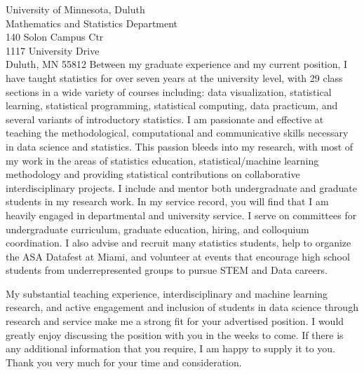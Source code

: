 \documentclass[11pt]{letter}\usepackage[]{graphicx}\usepackage[]{color}
\begin{document}
\begin{letter}{University of Minnesota, Duluth\\
Mathematics and Statistics Department\\
140 Solon Campus Ctr\\
1117 University Drive\\
Duluth, MN 55812
}
Between my graduate experience and my current position, I have taught statistics for over seven years at the university level, with 29 class sections in a wide variety of courses including: data visualization, statistical learning, statistical programming, statistical computing, data practicum, and several variants of introductory statistics. I am passionate and effective at teaching the methodological, computational and communicative skills necessary in data science and statistics. This passion bleeds into my research, with most of my work in the areas of statistics education, statistical/machine learning methodology and providing statistical contributions on collaborative interdisciplinary projects. I include and mentor both undergraduate and graduate students in my research work. In my service record, you will find that I am heavily engaged in departmental and university service. I serve on committees for undergraduate curriculum, graduate education, hiring, and colloquium coordination. I also advise and recruit many statistics students, help to organize the ASA Datafest at Miami, and volunteer at events that encourage high school students from underrepresented groups to pursue STEM and Data careers. 


My substantial teaching experience, interdisciplinary and machine learning research, and active engagement and inclusion of students in data science through research and service make me a strong fit for your advertised position. I would greatly enjoy discussing the position with you in the weeks to come. If there is any additional information that you require, I am happy to supply it to you. Thank you very much for your time and consideration.


\end{letter}
\end{document}
